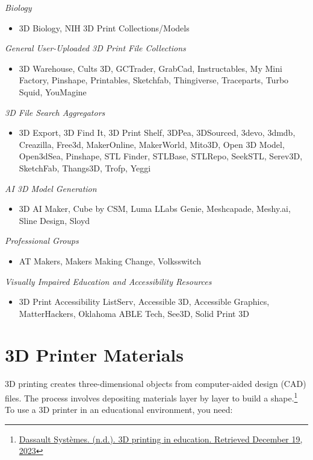 \emph{Biology}
\begin{itemize}
    \item 3D Biology, NIH 3D Print Collections/Models
\end{itemize}

\emph{General User-Uploaded 3D Print File Collections}
\begin{itemize}
    \item 3D Warehouse, Cults 3D, GCTrader, GrabCad, Instructables, My Mini Factory, Pinshape, Printables, Sketchfab, Thingiverse, Traceparts, Turbo Squid, YouMagine
\end{itemize}

\emph{3D File Search Aggregators}
\begin{itemize}
    \item 3D Export, 3D Find It, 3D Print Shelf, 3DPea, 3DSourced, 3devo, 3dmdb, Creazilla, Free3d, MakerOnline, MakerWorld, Mito3D, Open 3D Model, Open3dSea, Pinshape, STL Finder, STLBase, STLRepo, SeekSTL, Serev3D, SketchFab, Thangs3D, Trofp, Yeggi
\end{itemize}

\emph{AI 3D Model Generation}
\begin{itemize}
    \item 3D AI Maker, Cube by CSM, Luma LLabs Genie, Meshcapade, Meshy.ai, Sline Design, Sloyd
\end{itemize}

\emph{Professional Groups}
\begin{itemize}
    \item AT Makers, Makers Making Change, Volksswitch
\end{itemize}

\emph{Visually Impaired Education and Accessibility Resources}
\begin{itemize}
    \item 3D Print Accessibility ListServ, Accessible 3D, Accessible Graphics, MatterHackers, Oklahoma ABLE Tech, See3D, Solid Print 3D
\end{itemize}


\section{3D Printer Materials}\label{d-printer-materials}
3D printing creates three-dimensional objects from computer-aided design (CAD) files. The process involves depositing materials layer by layer to build a shape.\footnote{\href{http://www.3ds.com/make/solutions/industries/3d-printing-education}{Dassault Systèmes. (n.d.). 3D printing in education. Retrieved December 19, 2023}} To use a 3D printer in an educational environment, you need:

